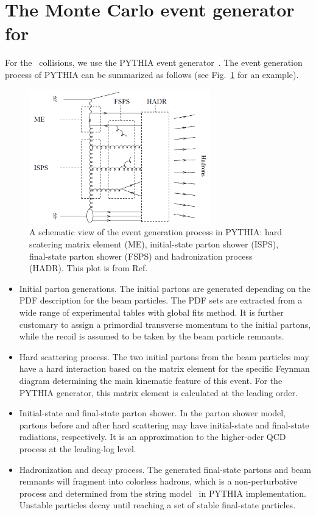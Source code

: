 \section{The Monte Carlo event generator for \ep\ } \label{sec:MC_ep}
For the \ep\ collisions, we use the PYTHIA event generator~\cite{Sjostrand:2006za}. The event generation
process of PYTHIA can be summarized as follows (see Fig.~\ref{fig:PYTHIA_generation_scheme} for an example).
\begin{figure}
\centering
\includegraphics[width=0.7\textwidth]{plots/chpt5/PYTHIA_generation_scheme.png}
\caption[An illustration of the event generation process in PYTHIA] {
A schematic view of the event generation process in PYTHIA: hard scatering matrix element (ME), 
initial-state parton shower (ISPS), final-state parton shower (FSPS) and hadronization process (HADR). 
This plot is from Ref.~\cite{Hansson:2007zz} }
\label{fig:PYTHIA_generation_scheme}
\end{figure}
\begin{itemize}
\item Initial parton generations. The initial partons are generated depending
on the PDF description for the beam particles. The PDF sets are extracted from
a wide range of experimental tables with global fits method. It is further customary to assign a primordial transverse momentum to the initial partons, while the recoil is assumed to be taken by the beam particle remnants. 
\item Hard scattering process. The two initial partons from the beam particles may
have a hard interaction based on the matrix element for the specific Feynman diagram
determining the main kinematic feature of this event. For the PYTHIA generator, this
matrix element is calculated at the leading order.
\item Initial-state and final-state parton shower. In the parton shower model, partons
before and after hard scattering may have initial-state and final-state radiations, respectively. It
is an approximation to the higher-oder QCD process at the leading-log level. 
\item Hadronization and decay process. The generated final-state partons and
beam remnants will fragment into colorless hadrons, which is a non-perturbative process
and determined from the string model~\cite{Andersson:1983ia} in PYTHIA implementation. Unstable particles decay
until reaching a set of stable final-state particles.
\end{itemize}

